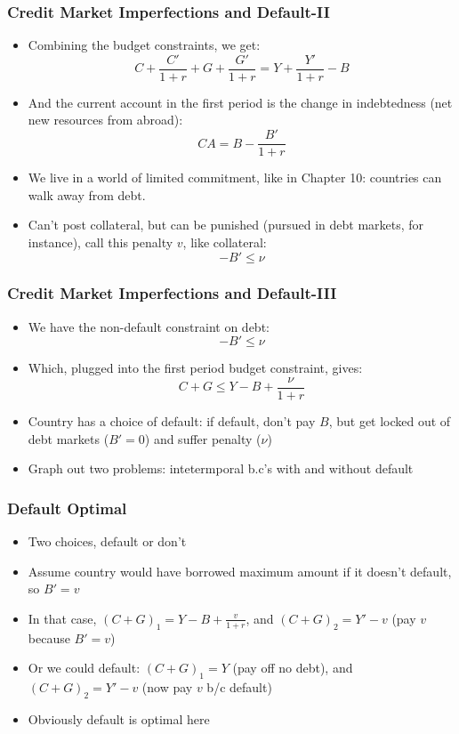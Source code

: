 \documentclass{beamer}
\begin{document}
\begin{frame}
\frametitle[alignment=center]{Credit Market Imperfections and Default-II}
\begin{itemize}
\item Combining the budget constraints, we get:
$$C+\frac{C'}{1+r}+G+\frac{G'}{1+r}=Y+\frac{Y'}{1+r}-B$$
\item And the current account in the first period is the change in indebtedness (net new resources from abroad):
$$CA=B-\frac{B'}{1+r}$$
\bigskip
\item We live in a world of limited commitment, like in Chapter 10:  countries can walk away from debt.
\bigskip
\item Can't post collateral, but can be punished (pursued in debt markets, for instance), call this penalty $v$, like collateral:
$$-B'\leq \nu$$
\end{itemize}
\end{frame}

\begin{frame}
\frametitle[alignment=center]{Credit Market Imperfections and Default-III}
\begin{itemize}
\item We have the non-default constraint on debt:
$$-B'\leq \nu$$
\item Which, plugged into the first period budget constraint, gives:
$$C+G\leq Y-B+\frac{\nu}{1+r}$$
\item Country has a choice of default:  if default, don't pay $B$, but get locked out of debt markets ($B'=0$) and suffer penalty ($\nu$)
\bigskip
\item Graph out two problems: intetermporal b.c's with and without default
\end{itemize}
\end{frame}

\begin{frame}
\frametitle[alignment=center]{Default Optimal}
\begin{itemize}
\item Two choices, default or don't
\bigskip
\item Assume country would have borrowed maximum amount if it doesn't default, so $B'=v$
\bigskip
\item In that case, $(C+G)_1=Y-B+\frac{v}{1+r}$, and $(C+G)_2=Y'-v$ (pay $v$ because $B'=v$)
\bigskip
\item Or we could default:  $(C+G)_1=Y$ (pay off no debt), and $(C+G)_2=Y'-v$ (now pay $v$ b/c default)
\bigskip
\item Obviously default is optimal here
\end{itemize}
\end{frame}
\end{document}

